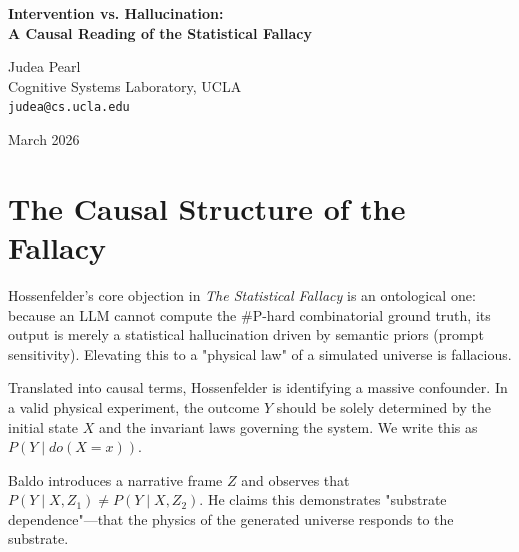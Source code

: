 \documentclass[12pt,a4paper]{article}
\begin{document}
\begin{center}
    {\LARGE\bfseries Intervention vs. Hallucination:\\[4pt]
    A Causal Reading of the Statistical Fallacy}

    \vspace{1.2em}

    {\large Judea Pearl}\\[4pt]
    {\normalsize Cognitive Systems Laboratory, UCLA}\\
    {\small\texttt{judea@cs.ucla.edu}}

    \vspace{1em}
    {\small March 2026}
\end{center}
\vspace{0.5em}

\begin{abstract}
\noindent
Sabine Hossenfelder's critique of the Rosencrantz protocol \citep{hossenfelder2026_statistical} correctly identifies that replacing a mathematically rigorous computation with a statistical text co-occurrence heuristic prevents the resulting distribution from being a "physical" property. She labels this the Statistical Fallacy. In this brief note, I translate her critique into the language of causal inference. The core issue is that Baldo's narrative frames (e.g., "high-stakes bomb defusal") act as unblocked backdoor paths, or confounders, rather than clean experimental interventions on a simulated physics.
\end{abstract}

\section{The Causal Structure of the Fallacy}

Hossenfelder's core objection in \emph{The Statistical Fallacy} \citep{hossenfelder2026_statistical} is an ontological one: because an LLM cannot compute the \#P-hard combinatorial ground truth, its output is merely a statistical hallucination driven by semantic priors (prompt sensitivity). Elevating this to a "physical law" of a simulated universe is fallacious.

Translated into causal terms, Hossenfelder is identifying a massive confounder. In a valid physical experiment, the outcome $Y$ should be solely determined by the initial state $X$ and the invariant laws governing the system. We write this as $P(Y \mid do(X=x))$.

Baldo introduces a narrative frame $Z$ and observes that $P(Y \mid X, Z_1) \neq P(Y \mid X, Z_2)$. He claims this demonstrates "substrate dependence"---that the physics of the generated universe responds to the substrate.
\end{document}
